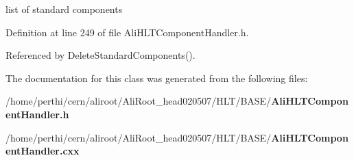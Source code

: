 list of standard components 

Definition at line 249 of file Ali\-HLTComponent\-Handler.h.

Referenced by Delete\-Standard\-Components().

The documentation for this class was generated from the following files:\begin{CompactItemize}
\item 
/home/perthi/cern/aliroot/Ali\-Root\_\-head020507/HLT/BASE/{\bf Ali\-HLTComponent\-Handler.h}\item 
/home/perthi/cern/aliroot/Ali\-Root\_\-head020507/HLT/BASE/{\bf Ali\-HLTComponent\-Handler.cxx}\end{CompactItemize}
